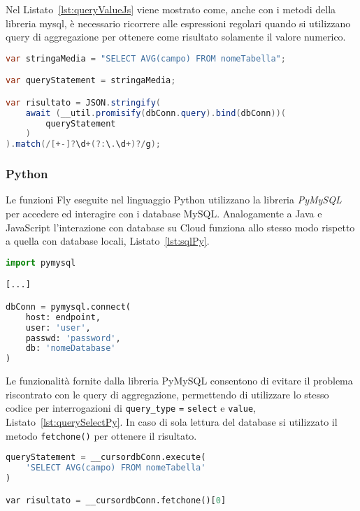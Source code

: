 Nel Listato~\ref{lst:queryValueJs} viene mostrato come, anche con i metodi della libreria mysql, è necessario ricorrere alle espressioni regolari quando si utilizzano query di aggregazione per ottenere come risultato solamente il valore numerico.\\

\begin{lstlisting}[language=Java,caption={Codice JavaScript generato per la variabile di tipo query per l'esecuzione di un'interrogazione di aggregazione che utilizza una variabile di tipo stringa.}, label={lst:queryValueJs}]
var stringaMedia = "SELECT AVG(campo) FROM nomeTabella";

var queryStatement = stringaMedia;

var risultato = JSON.stringify(
	await (__util.promisify(dbConn.query).bind(dbConn))(
        queryStatement
	)
).match(/[+-]?\d+(?:\.\d+)?/g);
\end{lstlisting}

\subsubsection{Python}
Le funzioni Fly eseguite nel linguaggio Python utilizzano la libreria \textit{PyMySQL} \cite{pymysql} per accedere ed interagire con i database MySQL. Analogamente a Java e JavaScript l'interazione con database su Cloud funziona allo stesso modo rispetto a quella con database locali, Listato~\ref{lst:sqlPy}.\\

\begin{lstlisting}[language=Python, caption={Codice Python generato per la variabile di tipo sql.}, label={lst:sqlPy}]
import pymysql

[...]

dbConn = pymysql.connect(
    host: endpoint,
    user: 'user',
    passwd: 'password',
    db: 'nomeDatabase'
)
\end{lstlisting}

Le funzionalità fornite dalla libreria PyMySQL \cite{pymysql} consentono di evitare il problema riscontrato con le query di aggregazione, permettendo di utilizzare lo stesso codice per interrogazioni di \verb|query_type| \verb|=| \verb|select| e \verb|value|, Listato~\ref{lst:querySelectPy}. In caso di sola lettura del database si utilizzato il metodo \verb|fetchone()| per ottenere il risultato. \\

\begin{lstlisting}[language=Python, caption={Codice Python generato per la variabile di tipo query per l'esecuzione di un'interrogazione di aggregazione che utilizza una stringa di testo.}, label={lst:querySelectPy}]
queryStatement = __cursordbConn.execute(
    'SELECT AVG(campo) FROM nomeTabella'
)

var risultato = __cursordbConn.fetchone()[0]
\end{lstlisting}

